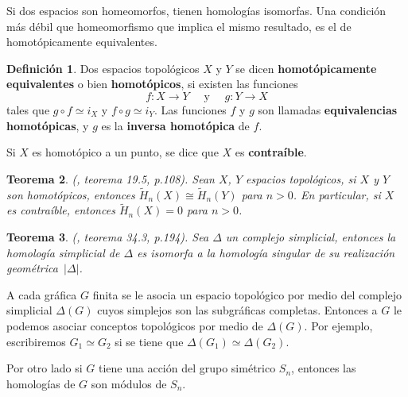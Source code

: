 \documentclass[12pt]{book}
\newtheorem{theorem}{Teorema}[section]
\theoremstyle{definition}
\newtheorem{definition}[theorem]{Definición}
\newcounter{in}
\newcounter{ini}
\begin{document}

Si dos espacios son homeomorfos, tienen homologías isomorfas. Una
condición más débil que homeomorfismo que implica el mismo resultado,
es el de homotópicamente equivalentes.
 
\begin{definition}
  Dos espacios topológicos $X$ y $Y$ se dicen \textbf{homotópicamente
    equivalentes} o bien \textbf{homotópicos}, si existen las funciones
  $$f:X\rightarrow Y \quad \mbox{ y }\quad g:Y\rightarrow X$$
  tales que $g\circ f\simeq i_{X}$ y $f\circ g\simeq i_{Y}$. Las
  funciones $f$ y $g$ son llamadas\textbf{ equivalencias homotópicas},
  y $g$ es la \textbf{inversa homotópica} de $f$. 
\end{definition}
Si $X$ es homotópico a un punto, se dice que $X$ es
\textbf{contraíble}.

\begin{theorem}{\normalfont(\cite{munkres1984elements}, teorema 19.5, p.108)}.
  Sean $X$, $Y$ espacios topológicos, si $X$ y $Y$ son homotópicos, entonces $\widetilde H_{n}(X)\cong \widetilde
  H_{n}(Y)$ para $n>0$. En particular, si $X$ es contraíble, entonces $\widetilde
  H_{n}(X)=0$ para $n>0$.
  \label{esp-homotopicos-homologias-iso}
\end{theorem}

\begin{theorem}{\normalfont(\cite{munkres1984elements}, teorema 34.3, p.194)}.
  Sea $\Delta$ un complejo simplicial, entonces la homología
  simplicial de $\Delta$ es isomorfa a la homología singular de su
  realización geométrica~$|\Delta|$.
  \label{homologia-realizacion}
\end{theorem}
 
A cada gráfica $G$ finita se le asocia un espacio topológico por
medio del complejo simplicial $\Delta(G)$ cuyos simplejos son
las subgráficas completas. Entonces a $G$ le podemos asociar conceptos topológicos por
medio de $\Delta(G)$. Por ejemplo, escribiremos $G_{1}\simeq G_{2}$ si
se tiene que $\Delta(G_{1})\simeq\Delta(G_{2})$.

Por otro lado si $G$ tiene una acción del grupo simétrico
$S_{n}$, entonces las homologías de $G$ son módulos
de $S_{n}$.
\end{document}
